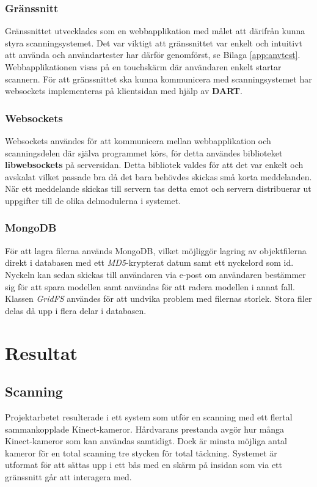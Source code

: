 \documentclass[a4paper,12pt,oneside,final]{extbook}
\begin{document}
\subsection{Gränssnitt}
Gränssnittet utvecklades som en webbapplikation med målet att därifrån kunna styra scanningsystemet. Det var viktigt att gränssnittet var enkelt och intuitivt att använda och användartester har därför genomförst, se Bilaga \ref{app:anvtest}. Webbapplikationen visas på en touchskärm där användaren enkelt startar scannern. För att gränssnittet ska kunna kommunicera med scanningsystemet har websockets implementeras på klientsidan med hjälp av \textbf{DART}.

\subsection{Websockets}
Websockets användes för att kommunicera mellan webbapplikation och scanningsdelen där själva programmet körs, för detta användes biblioteket \textbf{libwebsockets} på serversidan. Detta bibliotek valdes för att det var enkelt och avskalat vilket passade bra då det bara behövdes skickas små korta meddelanden. När ett meddelande skickas till servern tas detta emot och servern distribuerar ut uppgifter till de olika delmodulerna i systemet.

\subsection{MongoDB}
För att lagra filerna används MongoDB, vilket möjliggör lagring av objektfilerna direkt i databasen med ett \emph{MD5}-krypterat datum samt ett nyckelord som id. Nyckeln kan sedan skickas till användaren via e-post om användaren bestämmer sig för att spara modellen samt användas för att radera modellen i annat fall. Klassen \emph{GridFS} användes för att undvika problem med filernas storlek. Stora filer delas då upp i flera delar i databasen.


\chapter{Resultat}
\section{Scanning}
Projektarbetet resulterade i ett system som utför en scanning med ett flertal sammankopplade Kinect-kameror. Hårdvarans prestanda avgör hur många Kinect-kameror som kan användas samtidigt. Dock är minsta möjliga antal kameror för en total scanning tre stycken för total täckning. Systemet är utformat för att sättas upp i ett bås med en skärm på insidan som via ett gränssnitt går att interagera med.
\end{document}
